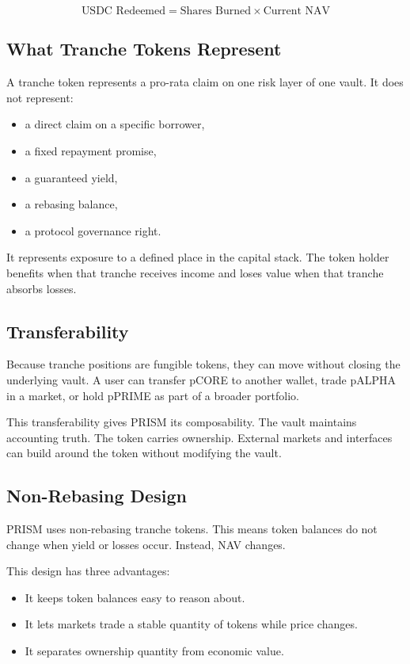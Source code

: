 \documentclass[11pt]{article}
\begin{document}
\[
\text{USDC Redeemed} = \text{Shares Burned} \times \text{Current NAV}
\]

\subsection{What Tranche Tokens Represent}

A tranche token represents a pro-rata claim on one risk layer of one vault. It
does not represent:

\begin{itemize}
  \item a direct claim on a specific borrower,
  \item a fixed repayment promise,
  \item a guaranteed yield,
  \item a rebasing balance,
  \item a protocol governance right.
\end{itemize}

It represents exposure to a defined place in the capital stack. The token holder
benefits when that tranche receives income and loses value when that tranche
absorbs losses.

\subsection{Transferability}

Because tranche positions are fungible tokens, they can move without closing the
underlying vault. A user can transfer pCORE to another wallet, trade pALPHA in a
market, or hold pPRIME as part of a broader portfolio.

This transferability gives PRISM its composability. The vault maintains
accounting truth. The token carries ownership. External markets and interfaces
can build around the token without modifying the vault.

\subsection{Non-Rebasing Design}

PRISM uses non-rebasing tranche tokens. This means token balances do not change
when yield or losses occur. Instead, NAV changes.

This design has three advantages:

\begin{itemize}
  \item It keeps token balances easy to reason about.
  \item It lets markets trade a stable quantity of tokens while price changes.
  \item It separates ownership quantity from economic value.
\end{itemize}
\end{document}
